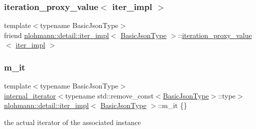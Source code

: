 \subsubsection{\texorpdfstring{iteration\+\_\+proxy\+\_\+value$<$ iter\+\_\+impl $>$}{iteration\_proxy\_value< iter\_impl >}}
{\footnotesize\ttfamily template$<$typename Basic\+Json\+Type$>$ \\
friend \hyperlink{classnlohmann_1_1detail_1_1iter__impl}{nlohmann\+::detail\+::iter\+\_\+impl}$<$ \hyperlink{classnlohmann_1_1detail_1_1iter__impl_abf18f18793f84b0222aebb5a2a87da7a}{Basic\+Json\+Type} $>$\+::\hyperlink{classnlohmann_1_1detail_1_1iteration__proxy__value}{iteration\+\_\+proxy\+\_\+value}$<$ \hyperlink{classnlohmann_1_1detail_1_1iter__impl}{iter\+\_\+impl} $>$\hspace{0.3cm}{\ttfamily [private]}}

\mbox{\label{classnlohmann_1_1detail_1_1iter__impl_a8a86a7c0d4af0cc4ab345b6f0e13cdfa}} 
\subsubsection{\texorpdfstring{m\+\_\+it}{m\_it}}
{\footnotesize\ttfamily template$<$typename Basic\+Json\+Type$>$ \\
\hyperlink{structnlohmann_1_1detail_1_1internal__iterator}{internal\+\_\+iterator}$<$typename std\+::remove\+\_\+const$<$\hyperlink{classnlohmann_1_1detail_1_1iter__impl_abf18f18793f84b0222aebb5a2a87da7a}{Basic\+Json\+Type}$>$\+::type$>$ \hyperlink{classnlohmann_1_1detail_1_1iter__impl}{nlohmann\+::detail\+::iter\+\_\+impl}$<$ \hyperlink{classnlohmann_1_1detail_1_1iter__impl_abf18f18793f84b0222aebb5a2a87da7a}{Basic\+Json\+Type} $>$\+::m\+\_\+it \{\}\hspace{0.3cm}{\ttfamily [private]}}



the actual iterator of the associated instance 

\mbox{\label{classnlohmann_1_1detail_1_1iter__impl_aca84f84be598bdfaaddd23d928c42bbb}} 

